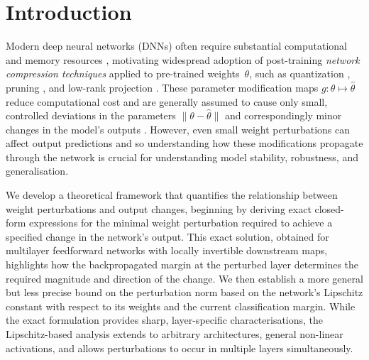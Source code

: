 \documentclass{article}
\theoremstyle{plain}
\theoremstyle{definition}
\theoremstyle{remark}
\begin{document}
\begin{abstract}
The minimal norm weight perturbations of DNNs required to achieve a specified change in output are derived and the factors determining its size are discussed. These single-layer exact formulae are contrasted with more generic multi-layer Lipschitz constant based robustness guarantees; both are observed to be of the same order which indicates similar efficacy in their guarantees. These results are applied to precision-modification-activated backdoor attacks, establishing provable compression thresholds below which such attacks cannot succeed, and show empirically that low-rank compression can reliably activate latent backdoors while preserving full-precision accuracy. These expressions reveal how back-propagated margins govern layer-wise sensitivity and provide certifiable guarantees on the smallest parameter updates consistent with a desired output shift.
\end{abstract}


\section{Introduction}

Modern deep neural networks (DNNs) often require substantial computational and memory resources \cite{strubell_energy_2019}, motivating widespread adoption of post-training \emph{network compression techniques} \cite{fu_cpt_2025} applied to pre-trained weights~$\theta$, such as quantization \cite{fiesler_weight_1990,zhang_lq-nets_2018}, pruning \cite{han_learning_2015}, and low-rank projection \cite{banerjee_linear_2014}.  
These parameter modification maps $g\colon\theta\mapsto\hat{\theta}$ reduce computational cost and are generally assumed to cause only small, controlled deviations in the parameters $\|\theta-\hat{\theta}\|$ and correspondingly minor changes in the model’s outputs \cite{hubara_quantized_2016}. However, even small weight perturbations can affect output predictions and so understanding how these modifications propagate through the network is crucial for understanding model stability, robustness, and generalisation.


We develop a theoretical framework that quantifies the relationship between weight perturbations and output changes, beginning by deriving exact closed-form expressions for the minimal weight perturbation required to achieve a specified change in the network’s output.  
This exact solution, obtained for multilayer feedforward networks with locally invertible downstream maps, highlights how the backpropagated margin at the perturbed layer determines the required magnitude and direction of the change.  
We then establish a more general but less precise bound on the perturbation norm based on the network’s Lipschitz constant with respect to its weights and the current classification margin.  
While the exact formulation provides sharp, layer-specific characterisations, the Lipschitz-based analysis extends to arbitrary architectures, general non-linear activations, and allows perturbations to occur in multiple layers simultaneously.
\end{document}
